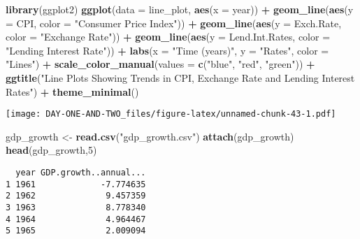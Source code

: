 \documentclass[
]{article}
\newenvironment{Shaded}{\begin{snugshade}}{\end{snugshade}}
\newcommand{\AttributeTok}[1]{\textcolor[rgb]{0.13,0.29,0.53}{#1}}
\newcommand{\DecValTok}[1]{\textcolor[rgb]{0.00,0.00,0.81}{#1}}
\newcommand{\FunctionTok}[1]{\textcolor[rgb]{0.13,0.29,0.53}{\textbf{#1}}}
\newcommand{\NormalTok}[1]{#1}
\newcommand{\OtherTok}[1]{\textcolor[rgb]{0.56,0.35,0.01}{#1}}
\newcommand{\SpecialCharTok}[1]{\textcolor[rgb]{0.81,0.36,0.00}{\textbf{#1}}}
\newcommand{\StringTok}[1]{\textcolor[rgb]{0.31,0.60,0.02}{#1}}
\begin{document}
\begin{Shaded}
\begin{Highlighting}[]
\FunctionTok{library}\NormalTok{(ggplot2)}
\FunctionTok{ggplot}\NormalTok{(}\AttributeTok{data =}\NormalTok{ line\_plot, }\FunctionTok{aes}\NormalTok{(}\AttributeTok{x =}\NormalTok{ year)) }\SpecialCharTok{+}
  \FunctionTok{geom\_line}\NormalTok{(}\FunctionTok{aes}\NormalTok{(}\AttributeTok{y =}\NormalTok{ CPI, }\AttributeTok{color =} \StringTok{"Consumer Price Index"}\NormalTok{)) }\SpecialCharTok{+}
  \FunctionTok{geom\_line}\NormalTok{(}\FunctionTok{aes}\NormalTok{(}\AttributeTok{y =}\NormalTok{ Exch.Rate, }\AttributeTok{color =} \StringTok{"Exchange Rate"}\NormalTok{)) }\SpecialCharTok{+}
  \FunctionTok{geom\_line}\NormalTok{(}\FunctionTok{aes}\NormalTok{(}\AttributeTok{y =}\NormalTok{ Lend.Int.Rates, }\AttributeTok{color =} \StringTok{"Lending Interest Rate"}\NormalTok{)) }\SpecialCharTok{+}
  \FunctionTok{labs}\NormalTok{(}\AttributeTok{x =} \StringTok{"Time (years)"}\NormalTok{, }\AttributeTok{y =} \StringTok{"Rates"}\NormalTok{, }\AttributeTok{color =} \StringTok{"Lines"}\NormalTok{) }\SpecialCharTok{+}
  \FunctionTok{scale\_color\_manual}\NormalTok{(}\AttributeTok{values =} \FunctionTok{c}\NormalTok{(}\StringTok{"blue"}\NormalTok{, }\StringTok{"red"}\NormalTok{, }\StringTok{"green"}\NormalTok{)) }\SpecialCharTok{+}
  \FunctionTok{ggtitle}\NormalTok{(}\StringTok{"Line Plots Showing Trends in CPI, Exchange Rate and Lending Interest Rates"}\NormalTok{) }\SpecialCharTok{+}
  \FunctionTok{theme\_minimal}\NormalTok{()}
\end{Highlighting}
\end{Shaded}

\texttt{[image: DAY-ONE-AND-TWO\_files/figure-latex/unnamed-chunk-43-1.pdf]}

\begin{Shaded}
\begin{Highlighting}[]
\NormalTok{gdp\_growth }\OtherTok{\textless{}{-}} \FunctionTok{read.csv}\NormalTok{(}\StringTok{"gdp\_growth.csv"}\NormalTok{)}
\FunctionTok{attach}\NormalTok{(gdp\_growth)}
\FunctionTok{head}\NormalTok{(gdp\_growth,}\DecValTok{5}\NormalTok{)}
\end{Highlighting}
\end{Shaded}

\begin{verbatim}
  year GDP.growth..annual...
1 1961             -7.774635
2 1962              9.457359
3 1963              8.778340
4 1964              4.964467
5 1965              2.009094
\end{verbatim}
\end{document}
